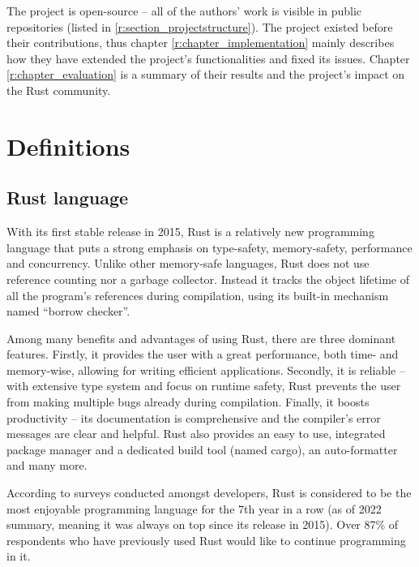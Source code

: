 \documentclass[licencjacka,en]{pracamgr}
\begin{document}
The project is open-source -- all of the authors' work is visible in public repositories
(listed in \ref{r:section_projectstructure}). The project existed before their contributions,
thus chapter \ref{r:chapter_implementation} mainly describes how they have
extended the project's functionalities and fixed its issues.
Chapter \ref{r:chapter_evaluation} is a summary of their results and the project's impact
on the Rust community.


\chapter{Definitions}\label{r:chapter_definitions}

\section{Rust language}

With its first stable release in 2015, Rust is a relatively new programming language that
puts a strong emphasis on type-safety, memory-safety, performance and concurrency. Unlike
other memory-safe languages, Rust does not use reference counting nor a garbage collector.
Instead it tracks the object lifetime of all the program's references during compilation,
using its built-in mechanism named ``borrow checker''.

Among many benefits and advantages of using Rust, there are three dominant features. Firstly,
it provides the user with a great performance, both time- and memory-wise, allowing for
writing efficient applications. Secondly, it is reliable -- with extensive type system and
focus on runtime safety, Rust prevents the user from making multiple bugs
already during compilation. Finally, it boosts productivity -- its documentation is
comprehensive and the compiler's error messages are clear and helpful. Rust also provides
an easy to use, integrated package manager and a dedicated build tool (named cargo),
an auto-formatter and many more.

According to surveys \cite{survey} conducted amongst developers, Rust is considered to be the most
enjoyable programming language for the 7th year in a row (as of 2022 summary, meaning it was always
on top since its release in 2015). Over 87\% of respondents who have previously used Rust would
like to continue programming in it.
\end{document}
